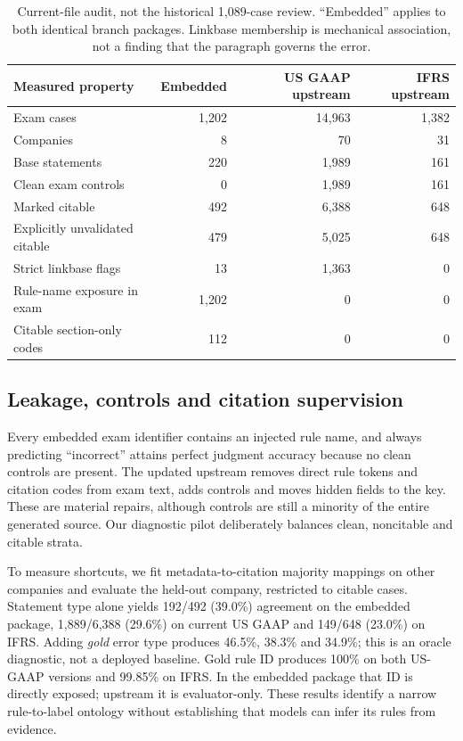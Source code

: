 \documentclass[11pt]{article}
\begin{document}
\begin{table}[t]
\centering\small
\begin{tabular}{lrrr}
\toprule
Measured property & Embedded & US GAAP upstream & IFRS upstream\\
\midrule
Exam cases & 1,202 & 14,963 & 1,382\\
Companies & 8 & 70 & 31\\
Base statements & 220 & 1,989 & 161\\
Clean exam controls & 0 & 1,989 & 161\\
Marked citable & 492 & 6,388 & 648\\
Explicitly unvalidated citable & 479 & 5,025 & 648\\
Strict linkbase flags & 13 & 1,363 & 0\\
Rule-name exposure in exam & 1,202 & 0 & 0\\
Citable section-only codes & 112 & 0 & 0\\
\bottomrule
\end{tabular}
\caption{Current-file audit, not the historical 1,089-case review. ``Embedded'' applies to both identical branch packages. Linkbase membership is mechanical association, not a finding that the paragraph governs the error.}
\label{tab:audit}
\end{table}

\subsection{Leakage, controls and citation supervision}
Every embedded exam identifier contains an injected rule name, and always predicting ``incorrect'' attains perfect judgment accuracy because no clean controls are present. The updated upstream removes direct rule tokens and citation codes from exam text, adds controls and moves hidden fields to the key. These are material repairs, although controls are still a minority of the entire generated source. Our diagnostic pilot deliberately balances clean, noncitable and citable strata.

To measure shortcuts, we fit metadata-to-citation majority mappings on other companies and evaluate the held-out company, restricted to citable cases. Statement type alone yields 192/492 (39.0\%) agreement on the embedded package, 1,889/6,388 (29.6\%) on current US GAAP and 149/648 (23.0\%) on IFRS. Adding \emph{gold} error type produces 46.5\%, 38.3\% and 34.9\%; this is an oracle diagnostic, not a deployed baseline. Gold rule ID produces 100\% on both US-GAAP versions and 99.85\% on IFRS. In the embedded package that ID is directly exposed; upstream it is evaluator-only. These results identify a narrow rule-to-label ontology without establishing that models can infer its rules from evidence.
\end{document}
